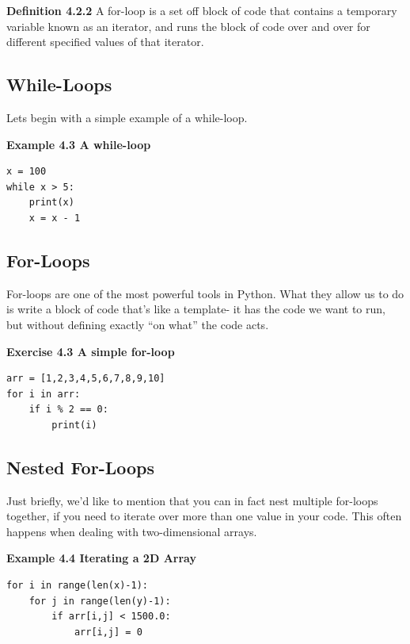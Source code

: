 \textbf{Definition 4.2.2} A for-loop is a set off block of code that contains a temporary variable known as an iterator, and runs the block of code over and over for different specified values of that iterator.

\subsection{While-Loops}
Lets begin with a simple example of a while-loop.

\textbf{Example 4.3 A while-loop}
\begin{lstlisting}
x = 100
while x > 5:
    print(x)
    x = x - 1
\end{lstlisting}

\subsection{For-Loops}
For-loops are one of the most powerful tools in Python. What they allow us to do is write a block of code that's like a template- it has the code we want to run, but without defining exactly ``on what'' the code acts.

\textbf{Exercise 4.3 A simple for-loop}
\begin{lstlisting}
arr = [1,2,3,4,5,6,7,8,9,10]
for i in arr:
    if i % 2 == 0:
        print(i)
\end{lstlisting}

\subsection{Nested For-Loops}
Just briefly, we'd like to mention that you can in fact nest multiple for-loops together, if you need to iterate over more than one value in your code. This often happens when dealing with two-dimensional arrays.

\textbf{Example 4.4 Iterating a 2D Array}
\begin{lstlisting}
for i in range(len(x)-1):
    for j in range(len(y)-1):
        if arr[i,j] < 1500.0:
            arr[i,j] = 0
\end{lstlisting}